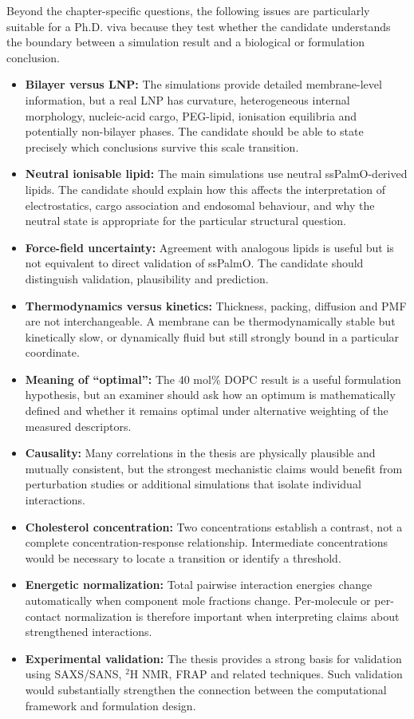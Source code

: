 \documentclass[11pt,a4paper]{article}
\begin{document}
Beyond the chapter-specific questions, the following issues are particularly suitable for a Ph.D. viva because they test whether the candidate understands the boundary between a simulation result and a biological or formulation conclusion.

\begin{itemize}[leftmargin=*]
\item \textbf{Bilayer versus LNP:} The simulations provide detailed membrane-level information, but a real LNP has curvature, heterogeneous internal morphology, nucleic-acid cargo, PEG-lipid, ionisation equilibria and potentially non-bilayer phases. The candidate should be able to state precisely which conclusions survive this scale transition.
\item \textbf{Neutral ionisable lipid:} The main simulations use neutral ssPalmO-derived lipids. The candidate should explain how this affects the interpretation of electrostatics, cargo association and endosomal behaviour, and why the neutral state is appropriate for the particular structural question.
\item \textbf{Force-field uncertainty:} Agreement with analogous lipids is useful but is not equivalent to direct validation of ssPalmO. The candidate should distinguish validation, plausibility and prediction.
\item \textbf{Thermodynamics versus kinetics:} Thickness, packing, diffusion and PMF are not interchangeable. A membrane can be thermodynamically stable but kinetically slow, or dynamically fluid but still strongly bound in a particular coordinate.
\item \textbf{Meaning of ``optimal'':} The 40 mol\% DOPC result is a useful formulation hypothesis, but an examiner should ask how an optimum is mathematically defined and whether it remains optimal under alternative weighting of the measured descriptors.
\item \textbf{Causality:} Many correlations in the thesis are physically plausible and mutually consistent, but the strongest mechanistic claims would benefit from perturbation studies or additional simulations that isolate individual interactions.
\item \textbf{Cholesterol concentration:} Two concentrations establish a contrast, not a complete concentration-response relationship. Intermediate concentrations would be necessary to locate a transition or identify a threshold.
\item \textbf{Energetic normalization:} Total pairwise interaction energies change automatically when component mole fractions change. Per-molecule or per-contact normalization is therefore important when interpreting claims about strengthened interactions.
\item \textbf{Experimental validation:} The thesis provides a strong basis for validation using SAXS/SANS, $^2$H NMR, FRAP and related techniques. Such validation would substantially strengthen the connection between the computational framework and formulation design.
\end{itemize}
\end{document}
